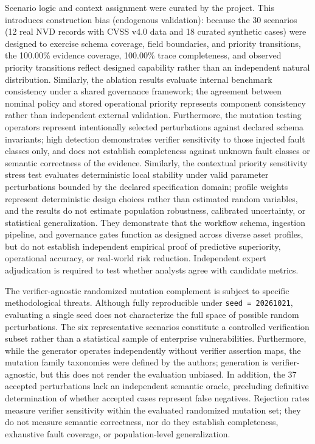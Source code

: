 \documentclass[conference]{IEEEtran}
\begin{document}
Scenario logic and context assignment were curated by the project. This introduces
construction bias (endogenous validation): because the 30 scenarios (12 real NVD records
with CVSS v4.0 data and 18 curated synthetic cases) were designed to exercise schema coverage,
field boundaries, and priority transitions, the 100.00\% evidence coverage, 100.00\% trace
completeness, and observed priority transitions reflect designed capability rather than an
independent natural distribution. Similarly, the ablation results evaluate internal benchmark
consistency under a shared governance framework; the agreement between nominal policy and stored
operational priority represents component consistency rather than independent external validation.
Furthermore, the mutation testing operators represent intentionally selected perturbations against
declared schema invariants; high detection demonstrates verifier sensitivity to those injected fault
classes only, and does not establish completeness against unknown fault classes or semantic correctness
of the evidence. Similarly, the contextual priority sensitivity stress test evaluates deterministic local stability under valid parameter perturbations bounded by the declared specification domain; profile weights represent deterministic design choices rather than estimated random variables, and the results do not estimate population robustness, calibrated uncertainty, or statistical generalization. They demonstrate that the workflow schema, ingestion pipeline,
and governance gates function as designed across diverse asset profiles, but do not establish
independent empirical proof of predictive superiority, operational accuracy, or real-world
risk reduction. Independent expert adjudication is required to test whether analysts agree
with candidate metrics.

The verifier-agnostic randomized mutation complement is subject to specific methodological threats. Although fully reproducible under \texttt{seed = 20261021}, evaluating a single seed does not characterize the full space of possible random perturbations. The six representative scenarios constitute a controlled verification subset rather than a statistical sample of enterprise vulnerabilities. Furthermore, while the generator operates independently without verifier assertion maps, the mutation family taxonomies were defined by the authors; generation is verifier-agnostic, but this does not render the evaluation unbiased. In addition, the 37 accepted perturbations lack an independent semantic oracle, precluding definitive determination of whether accepted cases represent false negatives. Rejection rates measure verifier sensitivity within the evaluated randomized mutation set; they do not measure semantic correctness, nor do they establish completeness, exhaustive fault coverage, or population-level generalization.
\end{document}
